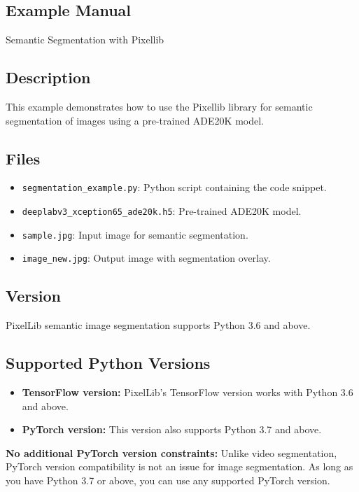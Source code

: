 \subsection{Example Manual}

Semantic Segmentation with Pixellib

\subsection{Description}
This example demonstrates how to use the Pixellib library for semantic segmentation of images using a pre-trained ADE20K model.

\subsection{Files}

\begin{itemize}
    \item \texttt{segmentation\_example.py}: Python script containing the code snippet.
    \item \texttt{deeplabv3\_xception65\_ade20k.h5}: Pre-trained ADE20K model.
    \item \texttt{sample.jpg}: Input image for semantic segmentation.
    \item \texttt{image\_new.jpg}: Output image with segmentation overlay.
\end{itemize}

\subsection{Version}

PixelLib semantic image segmentation supports Python 3.6 and above.

\subsection*{Supported Python Versions}

\begin{itemize}[label=--]
    \item \textbf{TensorFlow version:} PixelLib's TensorFlow version works with Python 3.6 and above.
    \item \textbf{PyTorch version:} This version also supports Python 3.7 and above.
\end{itemize}

\textbf{No additional PyTorch version constraints:} Unlike video segmentation, PyTorch version compatibility is not an issue for image segmentation. As long as you have Python 3.7 or above, you can use any supported PyTorch version.

